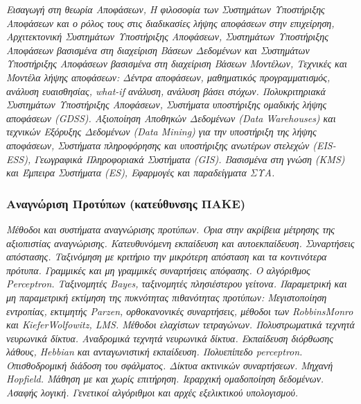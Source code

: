 \emph{Εισαγωγή στη θεωρία Αποφάσεων, Η φιλοσοφία των Συστημάτων
Υποστήριξης Αποφάσεων και ο ρόλος τους στις διαδικασίες λήψης αποφάσεων
στην επιχείρηση, Αρχιτεκτονική Συστημάτων Υποστήριξης Αποφάσεων,
Συστημάτων Υποστήριξης Αποφάσεων βασισμένα στη διαχείριση Βάσεων
Δεδομένων και Συστημάτων Υποστήριξης Αποφάσεων βασισμένα στη διαχείριση
Βάσεων Μοντέλων, Τεχνικές και Μοντέλα λήψης αποφάσεων: Δέντρα αποφάσεων,
μαθηματικός προγραμματισμός, ανάλυση ευαισθησίας, what-if ανάλυση,
ανάλυση βάσει στόχων. Πολυκριτηριακά Συστημάτων Υποστήριξης Αποφάσεων,
Συστήματα υποστήριξης ομαδικής λήψης αποφάσεων (GDSS). Αξιοποίηση
Αποθηκών Δεδομένων (Data Warehouses) και τεχνικών Εξόρυξης Δεδομένων
(Data Mining) για την υποστήριξη της λήψης αποφάσεων, Συστήματα
πληροφόρησης και υποστήριξης ανωτέρων στελεχών (EIS-ESS), Γεωγραφικά
Πληροφοριακά Συστήματα (GIS). Βασισμένα στη γνώση (KMS) και Έμπειρα
Συστήματα (ES), Εφαρμογές και παραδείγματα ΣΥΑ.}

\hypertarget{ux3b1ux3bdux3b1ux3b3ux3bdux3ceux3c1ux3b9ux3c3ux3b7-ux3c0ux3c1ux3bfux3c4ux3cdux3c0ux3c9ux3bd-ux3baux3b1ux3c4ux3b5ux3cdux3b8ux3c5ux3bdux3c3ux3b7ux3c2-ux3c0ux3b1ux3baux3b5}{%
\subsubsection{Αναγνώριση Προτύπων (κατεύθυνσης
ΠΑΚΕ)}\label{ux3b1ux3bdux3b1ux3b3ux3bdux3ceux3c1ux3b9ux3c3ux3b7-ux3c0ux3c1ux3bfux3c4ux3cdux3c0ux3c9ux3bd-ux3baux3b1ux3c4ux3b5ux3cdux3b8ux3c5ux3bdux3c3ux3b7ux3c2-ux3c0ux3b1ux3baux3b5}}

\emph{Μέθοδοι και συστήματα αναγνώρισης προτύπων. Όρια στην ακρίβεια
μέτρησης της αξιοπιστίας αναγνώρισης. Κατευθυνόμενη εκπαίδευση και
αυτοεκπαίδευση. Συναρτήσεις απόστασης. Ταξινόμηση με κριτήριο την
μικρότερη απόσταση και τα κοντινότερα πρότυπα. Γραμμικές και μη
γραμμικές συναρτήσεις απόφασης. Ο αλγόριθμος Perceptron. Ταξινομητές
Bayes, ταξινομητές πλησιέστερου γείτονα. Παραμετρική και μη παραμετρική
εκτίμηση της πυκνότητας πιθανότητας προτύπων: Μεγιστοποίηση εντροπίας,
εκτιμητής Parzen, ορθοκανονικές συναρτήσεις, μέθοδοι των RobbinsMonro
και KieferWolfowitz, LMS. Μέθοδοι ελαχίστων τετραγώνων. Πολυστρωματικά
τεχνητά νευρωνικά δίκτυα. Aναδρομικά τεχνητά νευρωνικά δίκτυα.
Εκπαίδευση διόρθωσης λάθους, Hebbian και ανταγωνιστική εκπαίδευση.
Πολυεπίπεδο perceptron. Οπισθοδρομική διάδοση του σφάλματος. Δίκτυα
ακτινικών συναρτήσεων. Μηχανή Hopfield. Μάθηση με και χωρίς επιτήρηση.
Ιεραρχική ομαδοποίηση δεδομένων. Ασαφής λογική. Γενετικοί αλγόριθμοι και
αρχές εξελικτικού υπολογισμού.}

